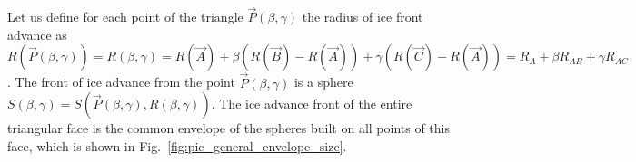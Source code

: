 \documentclass[
11pt,%
tightenlines,%
twoside,%
onecolumn,%
nofloats,%
nobibnotes,%
nofootinbib,%
superscriptaddress,%
noshowpacs,%
centertags]%
{revtex4-2}
\begin{document}
Let us define for each point of the triangle $\vec{P}(\beta, \gamma)$ the radius of ice front advance as $R(\vec{P}(\beta, \gamma)) = R(\beta, \gamma) = R(\vec{A}) + \beta (R(\vec{B}) - R(\vec{A})) + \gamma (R(\vec{C}) - R(\vec{A} )) = R_A + \beta R_{AB} + \gamma R_{AC}$.
The front of ice advance from the point $\vec{P}(\beta, \gamma)$ is a sphere $S(\beta, \gamma) = S(\vec{P}(\beta, \gamma), R(\beta,\gamma))$.
The ice advance front of the entire triangular face is the common envelope of the spheres built on all points of this face, which is shown in Fig.~\ref{fig:pic_general_envelope_size}.
\end{document}
